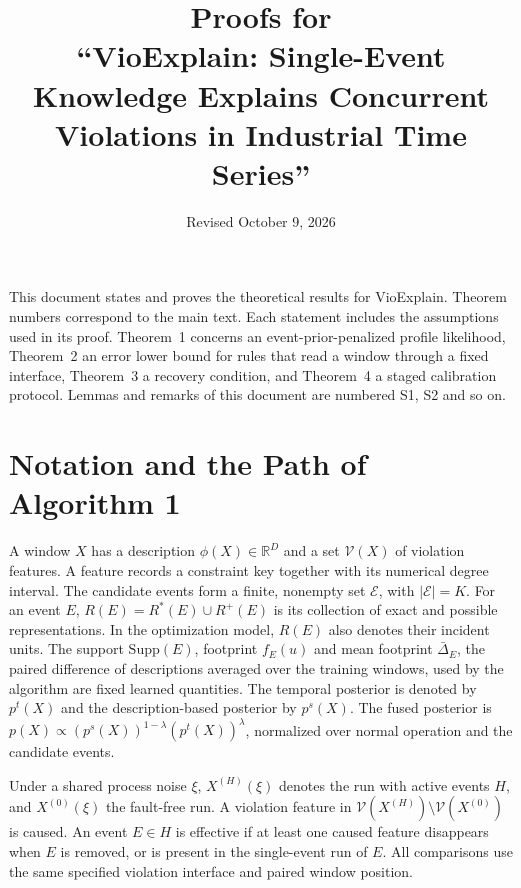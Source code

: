 \documentclass[10pt]{article}
\title{Proofs for\\ ``VioExplain: Single-Event Knowledge Explains Concurrent Violations in Industrial Time Series''}
\author{}
\date{Revised October 9, 2026}
\newcommand{\V}{\mathcal{V}}
\newcommand{\E}{\mathcal{E}}
\newcommand{\Supp}{\mathrm{Supp}}
\theoremstyle{plain}
\theoremstyle{remark}
\begin{document}
\maketitle

This document states and proves the theoretical results for VioExplain. Theorem numbers correspond to the main text. Each statement includes the assumptions used in its proof. Theorem~1 concerns an event-prior-penalized profile likelihood, Theorem~2 an error lower bound for rules that read a window through a fixed interface, Theorem~3 a recovery condition, and Theorem~4 a staged calibration protocol. Lemmas and remarks of this document are numbered S1, S2 and so on.

\section{Notation and the Path of Algorithm 1}
\label{sec:s-notation}

A window $X$ has a description $\phi(X)\in\mathbb R^D$ and a set $\V(X)$ of violation features. A feature records a constraint key together with its numerical degree interval. The candidate events form a finite, nonempty set $\E$, with $|\E|=K$. For an event $E$, $R(E)=R^*(E)\cup R^+(E)$ is its collection of exact and possible representations. In the optimization model, $R(E)$ also denotes their incident units. The support $\Supp(E)$, footprint $f_E(u)$ and mean footprint $\bar\Delta_E$, the paired difference of descriptions averaged over the training windows, used by the algorithm are fixed learned quantities. The temporal posterior is denoted by $p^t(X)$ and the description-based posterior by $p^s(X)$. The fused posterior is $p(X)\propto(p^s(X))^{1-\lambda}(p^t(X))^\lambda$, normalized over normal operation and the candidate events.

Under a shared process noise $\xi$, $X^{(H)}(\xi)$ denotes the run with active events $H$, and $X^{(0)}(\xi)$ the fault-free run. A violation feature in $\V(X^{(H)})\setminus\V(X^{(0)})$ is caused. An event $E\in H$ is effective if at least one caused feature disappears when $E$ is removed, or is present in the single-event run of $E$. All comparisons use the same specified violation interface and paired window position.
\end{document}
